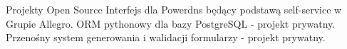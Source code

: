 \begin{rubric}{Projekty Open Source}
Interfejs dla Powerdns będący podstawą self-service w Grupie Allegro.
ORM pythonowy dla bazy PostgreSQL - projekt prywatny.
Przenośny system generowania i walidacji formularzy - projekt prywatny.
\end{rubric}

